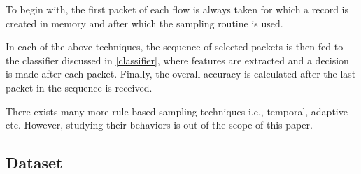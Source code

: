 \documentclass[conference]{IEEEtran}
\begin{document}
To begin with, the first packet of each flow is always taken for which a record is created in memory and after which the sampling routine is used. 

In each of the above techniques, the sequence of selected packets is then fed to the classifier discussed in \ref{classifier}, where features are extracted and a decision is made after each packet. Finally, the overall accuracy is calculated after the last packet in the sequence is received.

There exists many more rule-based sampling techniques i.e., temporal, adaptive etc. However, studying their behaviors is out of the scope of this paper.

\subsection{Dataset}
\end{document}

